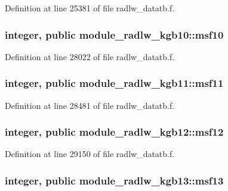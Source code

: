 Definition at line 25381 of file radlw\+\_\+datatb.\+f.

\subsubsection[{\texorpdfstring{msf10}{msf10}}]{\setlength{\rightskip}{0pt plus 5cm}integer, public module\+\_\+radlw\+\_\+kgb10\+::msf10}\hypertarget{group__module__radlw__main_ga1b69c6fe99ed4ebc7b3d78b8f842b880}{}\label{group__module__radlw__main_ga1b69c6fe99ed4ebc7b3d78b8f842b880}


Definition at line 28022 of file radlw\+\_\+datatb.\+f.

\subsubsection[{\texorpdfstring{msf11}{msf11}}]{\setlength{\rightskip}{0pt plus 5cm}integer, public module\+\_\+radlw\+\_\+kgb11\+::msf11}\hypertarget{group__module__radlw__main_ga7dcec9b9f19a3f5f13d443572d834628}{}\label{group__module__radlw__main_ga7dcec9b9f19a3f5f13d443572d834628}


Definition at line 28481 of file radlw\+\_\+datatb.\+f.

\subsubsection[{\texorpdfstring{msf12}{msf12}}]{\setlength{\rightskip}{0pt plus 5cm}integer, public module\+\_\+radlw\+\_\+kgb12\+::msf12}\hypertarget{group__module__radlw__main_ga3282a15ee0faaafd65509536a59e5b4f}{}\label{group__module__radlw__main_ga3282a15ee0faaafd65509536a59e5b4f}


Definition at line 29150 of file radlw\+\_\+datatb.\+f.

\subsubsection[{\texorpdfstring{msf13}{msf13}}]{\setlength{\rightskip}{0pt plus 5cm}integer, public module\+\_\+radlw\+\_\+kgb13\+::msf13}\hypertarget{group__module__radlw__main_ga7f88590d2a9fc392b04e89fd3d4bf2bf}{}\label{group__module__radlw__main_ga7f88590d2a9fc392b04e89fd3d4bf2bf}


